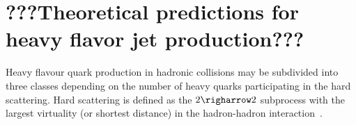 

\section{???Theoretical predictions for heavy flavor jet production???}%

Heavy flavour quark production in hadronic collisions may be subdivided into three classes depending on the number of heavy quarks participating in the hard scattering. Hard scattering is defined as the $2 \righarrow 2$ subprocess with the largest virtuality (or shortest distance) in the hadron-hadron interaction~\cite{Norrbin:2000zc}.
